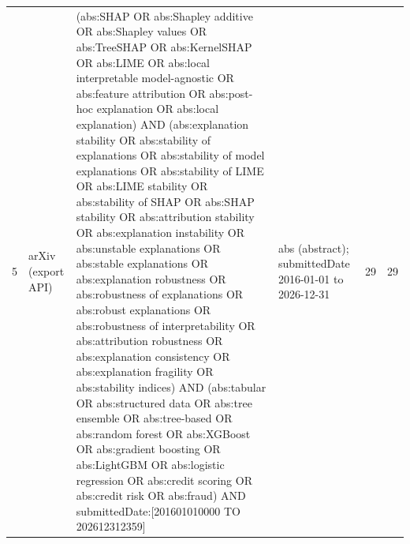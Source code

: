 \begin{longtable}{@{}P{0.4cm}P{2.2cm}P{8.0cm}P{2.5cm}P{1.0cm}P{1.1cm}@{}}
5 & arXiv (export API) & {\ttfamily\scriptsize (abs:SHAP OR\allowbreak{} abs:\textquotedbl{}Shapley additive\textquotedbl{} OR\allowbreak{} abs:\textquotedbl{}Shapley values\textquotedbl{} OR\allowbreak{} abs:TreeSHAP OR\allowbreak{} abs:KernelSHAP OR\allowbreak{} abs:LIME OR\allowbreak{} abs:\textquotedbl{}local interpretable model-agnostic\textquotedbl{} OR\allowbreak{} abs:\textquotedbl{}feature attribution\textquotedbl{} OR\allowbreak{} abs:\textquotedbl{}post-hoc explanation\textquotedbl{} OR\allowbreak{} abs:\textquotedbl{}local explanation\textquotedbl{}) AND\allowbreak{} (abs:\textquotedbl{}explanation stability\textquotedbl{} OR\allowbreak{} abs:\textquotedbl{}stability of explanations\textquotedbl{} OR\allowbreak{} abs:\textquotedbl{}stability of model explanations\textquotedbl{} OR\allowbreak{} abs:\textquotedbl{}stability of LIME\textquotedbl{} OR\allowbreak{} abs:\textquotedbl{}LIME stability\textquotedbl{} OR\allowbreak{} abs:\textquotedbl{}stability of SHAP\textquotedbl{} OR\allowbreak{} abs:\textquotedbl{}SHAP stability\textquotedbl{} OR\allowbreak{} abs:\textquotedbl{}attribution stability\textquotedbl{} OR\allowbreak{} abs:\textquotedbl{}explanation instability\textquotedbl{} OR\allowbreak{} abs:\textquotedbl{}unstable explanations\textquotedbl{} OR\allowbreak{} abs:\textquotedbl{}stable explanations\textquotedbl{} OR\allowbreak{} abs:\textquotedbl{}explanation robustness\textquotedbl{} OR\allowbreak{} abs:\textquotedbl{}robustness of explanations\textquotedbl{} OR\allowbreak{} abs:\textquotedbl{}robust explanations\textquotedbl{} OR\allowbreak{} abs:\textquotedbl{}robustness of interpretability\textquotedbl{} OR\allowbreak{} abs:\textquotedbl{}attribution robustness\textquotedbl{} OR\allowbreak{} abs:\textquotedbl{}explanation consistency\textquotedbl{} OR\allowbreak{} abs:\textquotedbl{}explanation fragility\textquotedbl{} OR\allowbreak{} abs:\textquotedbl{}stability indices\textquotedbl{}) AND\allowbreak{} (abs:tabular OR\allowbreak{} abs:\textquotedbl{}structured data\textquotedbl{} OR\allowbreak{} abs:\textquotedbl{}tree ensemble\textquotedbl{} OR\allowbreak{} abs:\textquotedbl{}tree-based\textquotedbl{} OR\allowbreak{} abs:\textquotedbl{}random forest\textquotedbl{} OR\allowbreak{} abs:XGBoost OR\allowbreak{} abs:\textquotedbl{}gradient boosting\textquotedbl{} OR\allowbreak{} abs:LightGBM OR\allowbreak{} abs:\textquotedbl{}logistic regression\textquotedbl{} OR\allowbreak{} abs:\textquotedbl{}credit scoring\textquotedbl{} OR\allowbreak{} abs:\textquotedbl{}credit risk\textquotedbl{} OR\allowbreak{} abs:fraud) AND\allowbreak{} submittedDate:[201601010000 TO 202612312359]} & abs (abstract); submittedDate 2016-01-01 to 2026-12-31 & 29 & 29 \\

\end{longtable}
